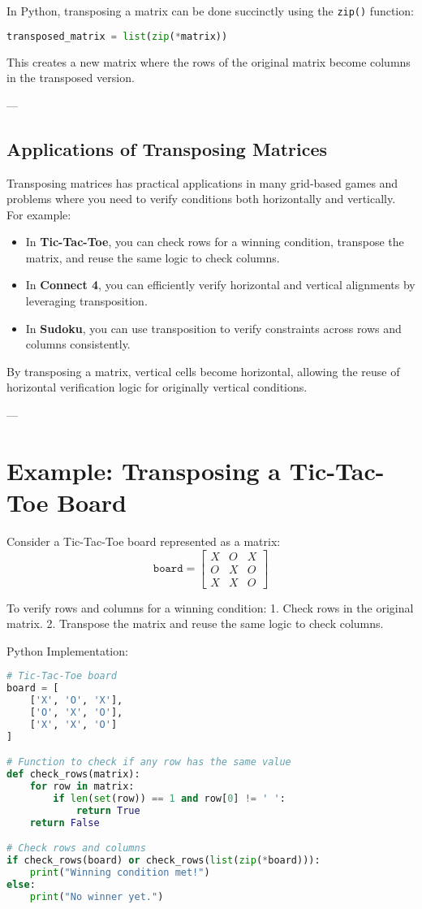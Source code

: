 In Python, transposing a matrix can be done succinctly using the \texttt{zip()} function:

\begin{lstlisting}[language=Python]
transposed_matrix = list(zip(*matrix))
\end{lstlisting}

This creates a new matrix where the rows of the original matrix become columns in the transposed version.

---

\subsection*{Applications of Transposing Matrices}
Transposing matrices has practical applications in many grid-based games and problems where you need to verify conditions both horizontally and vertically. For example:
\begin{itemize}
    \item In \textbf{Tic-Tac-Toe}, you can check rows for a winning condition, transpose the matrix, and reuse the same logic to check columns.
    \item In \textbf{Connect 4}, you can efficiently verify horizontal and vertical alignments by leveraging transposition.
    \item In \textbf{Sudoku}, you can use transposition to verify constraints across rows and columns consistently.
\end{itemize}

By transposing a matrix, vertical cells become horizontal, allowing the reuse of horizontal verification logic for originally vertical conditions.

---

\section*{Example: Transposing a Tic-Tac-Toe Board}
Consider a Tic-Tac-Toe board represented as a matrix:
\[
\texttt{board} =
\begin{bmatrix}
X & O & X \\
O & X & O \\
X & X & O
\end{bmatrix}
\]

To verify rows and columns for a winning condition:
1. Check rows in the original matrix.
2. Transpose the matrix and reuse the same logic to check columns.

Python Implementation:
\begin{lstlisting}[language=Python]
# Tic-Tac-Toe board
board = [
    ['X', 'O', 'X'],
    ['O', 'X', 'O'],
    ['X', 'X', 'O']
]

# Function to check if any row has the same value
def check_rows(matrix):
    for row in matrix:
        if len(set(row)) == 1 and row[0] != ' ':
            return True
    return False

# Check rows and columns
if check_rows(board) or check_rows(list(zip(*board))):
    print("Winning condition met!")
else:
    print("No winner yet.")
\end{lstlisting}

